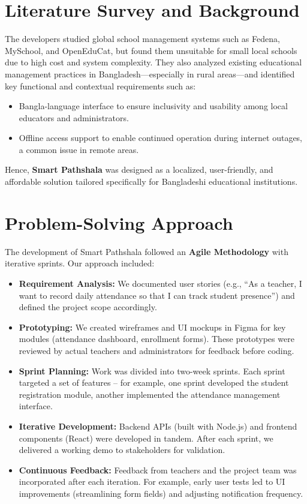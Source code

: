 \documentclass[12pt,a4paper]{report}
\newcommand{\project}[1]{\textcolor{projectcolor}{\textbf{#1}}}
\let\oldcite\cite
\renewcommand{\cite}[1]{\textcolor{impactcolor}{\oldcite{#1}}}
\newenvironment{coloritemize}
{\begin{itemize}[label=\textcolor{primaryblue}{$\bullet$}]}
{\end{itemize}}
\begin{document}
\section{Literature Survey and Background}
The developers studied global school management systems such as Fedena, MySchool, and OpenEduCat, but found them unsuitable for small local schools due to high cost and system complexity. They also analyzed existing educational management practices in Bangladesh—especially in rural areas—and identified key functional and contextual requirements such as:

\begin{coloritemize}
    \item Bangla-language interface to ensure inclusivity and usability among local educators and administrators.
    \item Offline access support to enable continued operation during internet outages, a common issue in remote areas.
\end{coloritemize}

Hence, \project{Smart Pathshala} was designed as a localized, user-friendly, and affordable solution tailored specifically for Bangladeshi educational institutions.


\section{Problem-Solving Approach}
The development of Smart Pathshala followed an \textbf{Agile \cite{ref8} Methodology} with iterative sprints. Our approach included:
\begin{coloritemize}
    \item \textcolor{secondaryblue}{\textbf{Requirement Analysis:}} We documented user stories (e.g., “As a teacher, I want to record daily attendance so that I can track student presence”) and defined the project scope accordingly.
    \item \textcolor{secondaryblue}{\textbf{Prototyping:}} We created wireframes and UI mockups in Figma for key modules (attendance dashboard, enrollment forms). These prototypes were reviewed by actual teachers and administrators for feedback before coding.
    \item \textcolor{secondaryblue}{\textbf{Sprint Planning:}} Work was divided into two-week sprints. Each sprint targeted a set of features – for example, one sprint developed the student registration module, another implemented the attendance management interface.
    \item \textcolor{secondaryblue}{\textbf{Iterative Development:}} Backend APIs (built with Node.js) and frontend components (React) were developed in tandem. After each sprint, we delivered a working demo to stakeholders for validation.
    \item \textcolor{secondaryblue}{\textbf{Continuous Feedback:}} Feedback from teachers and the project team was incorporated after each iteration. For example, early user tests led to UI improvements (streamlining form fields) and adjusting notification frequency.
\end{coloritemize}
\end{document}
